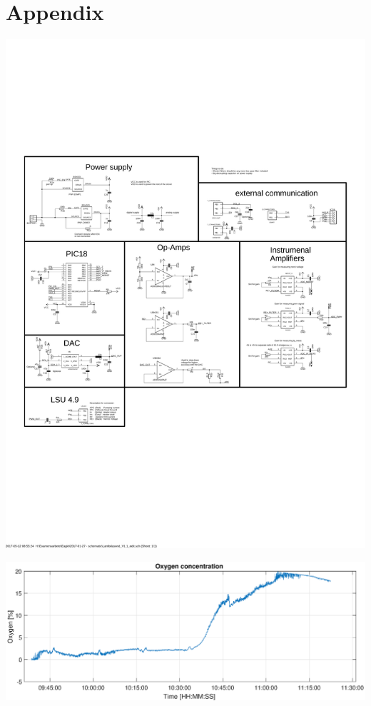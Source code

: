 \documentclass %
[																	%
	aspectratio=1610,                                               %
	11pt,															%
	hyperref={pdfpagelabels=false},									%
	xcolor	= pdftex, dvipsnames, table,							%
]																	%
{beamer}															%
\begin{document}
\section*{Appendix}

\begin{frame}

\begin{center}
    \includegraphics[width=.8\textwidth]{Images/Lambdasond_schematic.pdf}
\end{center}
    
\end{frame}


\begin{frame}

\begin{center}
    \includegraphics[width=\textwidth]{Images/oxygen_second_big.eps}
\end{center}
    
\end{frame}
\end{document}
